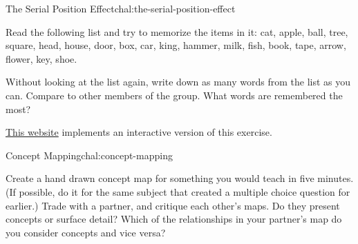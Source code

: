 \begin{challenge}{The Serial Position Effect}{chal:the-serial-position-effect}

Read the following list and try to memorize the items in it: cat,
apple, ball, tree, square, head, house, door, box, car, king, hammer,
milk, fish, book, tape, arrow, flower, key, shoe.

Without looking at the list again, write down as many words from the
list as you can. Compare to other members of the group. What words are
remembered the most?

\href{http://cat.xula.edu/thinker/memory/working/serial}{This website}
implements an interactive version of this exercise.

\end{challenge}

\begin{challenge}{Concept Mapping}{chal:concept-mapping}

Create a hand drawn concept map for something you would teach in five
minutes.  (If possible, do it for the same subject that created a
multiple choice question for earlier.) Trade with a partner, and
critique each other's maps. Do they present concepts or surface
detail? Which of the relationships in your partner's map do you
consider concepts and vice versa?

\end{challenge}
